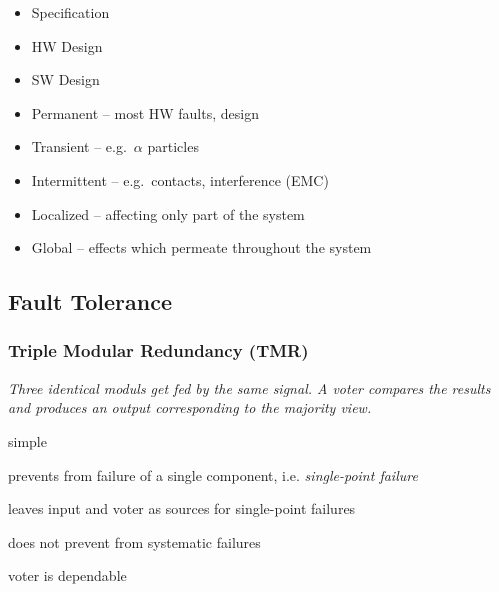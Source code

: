 \documentclass[
  10pt,
  a4paper,
]{article}
\providecommand{\tightlist}{%
  \setlength{\itemsep}{0pt}\setlength{\parskip}{0pt}}\usepackage{longtable,booktabs,array}
\DeclareRobustCommand{\textHighlight}[1]{\tikz[baseline]{\node[anchor=base,fill=Gray!10, rounded corners=5pt, draw, densely dotted] {\bfseries{#1}};}}
\begin{document}
\begin{multicols*}{2}
\begin{itemize}
  \begin{itemize}
  \tightlist
  \item
    Specification
  \item
    HW Design
  \item
    SW Design
  \end{itemize}
\end{itemize}

\textHighlight{\bfseries D{\fontsize{7pt}{8pt}\selectfont{URATION}}}

\begin{itemize}
\tightlist
\item
  Permanent -- most HW faults, design
\item
  Transient -- e.g.~\(\alpha\) particles
\item
  Intermittent -- e.g.~contacts, interference (EMC)
\end{itemize}

\textHighlight{\bfseries E{\fontsize{7pt}{8pt}\selectfont{XTEND}}}

\begin{itemize}
\tightlist
\item
  Localized -- affecting only part of the system
\item
  Global -- effects which permeate throughout the system
\end{itemize}

\subsection{Fault Tolerance}\label{fault-tolerance}

\subsubsection{Triple Modular Redundancy
(TMR)}\label{triple-modular-redundancy-tmr}

{\small\textit{Three identical moduls get fed by the same signal. A voter compares the results and produces an output corresponding to the majority view.}}

\begin{center}

\end{center}

{\small\begin{description}[parsep=0mm,labelsep=2pt,labelwidth=10pt]
  \item[\color{OliveGreen}\faPlus] simple
  \item[\color{OliveGreen}\faPlus] prevents from failure of a single component, i.e. \textit{single-point failure}
  \item[\color{BrickRed}\faMinus] leaves input and voter as sources for single-point failures
  \item[\color{BrickRed}\faMinus] does not prevent from systematic failures
  \item[\color{BrickRed}\faMinus] voter is dependable
\end{description}}


\end{multicols*}
\end{document}
